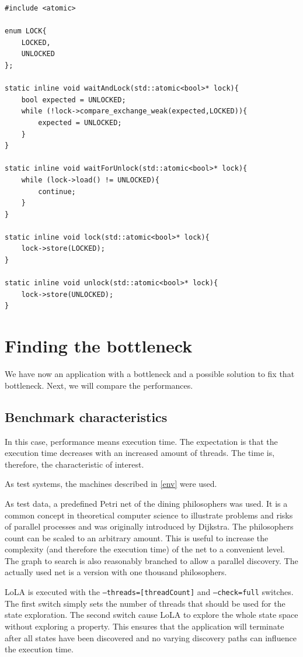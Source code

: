 \begin{lstlisting}
#include <atomic>

enum LOCK{
    LOCKED,
    UNLOCKED
};

static inline void waitAndLock(std::atomic<bool>* lock){
    bool expected = UNLOCKED;
    while (!lock->compare_exchange_weak(expected,LOCKED)){
        expected = UNLOCKED;
    }
}

static inline void waitForUnlock(std::atomic<bool>* lock){
    while (lock->load() != UNLOCKED){
        continue;
    }
}

static inline void lock(std::atomic<bool>* lock){
    lock->store(LOCKED);
}

static inline void unlock(std::atomic<bool>* lock){
    lock->store(UNLOCKED);
}
\end{lstlisting}

\section{Finding the bottleneck}
We have now an application with a bottleneck and a possible solution to fix that bottleneck. Next, we will compare the performances.

\subsection{Benchmark characteristics}
In this case, performance means execution time. The expectation is that the execution time decreases with an increased amount of threads. The time is, therefore, the characteristic of interest.

As test systems, the machines described in \ref{env} were used.

As test data, a predefined Petri net of the dining philosophers was used. It is a common concept in theoretical computer science to illustrate problems and risks of parallel processes and was originally introduced by Dijkstra\cite{dijkstra1971hierarchical}. The philosophers count can be scaled to an arbitrary amount. This is useful to increase the complexity (and therefore the execution time) of the net to a convenient level. The graph to search is also reasonably branched to allow a parallel discovery. The actually used net is a version with one thousand philosophers.

LoLA is executed with the \texttt{--threads=[threadCount]} and \texttt{--check=full} switches. The first switch simply sets the number of threads that should be used for the state exploration. The second switch cause LoLA to explore the whole state space without exploring a property. This ensures that the application will terminate after all states have been discovered and no varying discovery paths can influence the execution time.


